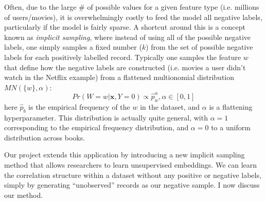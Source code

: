 \documentclass{article}
\begin{document}
Often, due to the large \# of possible values for a given feature type (i.e. millions of users/movies), it is overwhelmingly costly to feed the model all negative labels, particularly if the model is fairly sparse. A shortcut around this is a concept known as \textit{implicit sampling}, where instead of using all of the possible negative labels, one simply samples a fixed number ($k$) from the set of possible negative labels for each positively labelled record. Typically one samples the feature $w$ that define how the negative labels are constructed (i.e. movies a user didn't watch in the Netflix example) from a flattened multionomial distribution $MN(\{w\},\alpha)$: 
\[Pr(W=w|\mathbf{x},Y=0)  \propto \hat p_w^\alpha,\alpha \in [0,1] \] 
here $\hat p_b$  is the empirical frequency of the $w$ in the dataset, and $\alpha$ is a flattening hyperparameter. This distribution is actually quite general, with $\alpha=1$ corresponding to the empirical frequency distribution, and $\alpha=0$ to a uniform distribution across books.


Our project extends this application by introducing a new implicit sampling method that allows researchers to learn unsupervised embeddings. We can learn the correlation structure within a dataset without any positive or negative labels, simply by generating ``unobserved'' records as our negative sample. I now discuss our method.
\end{document}
